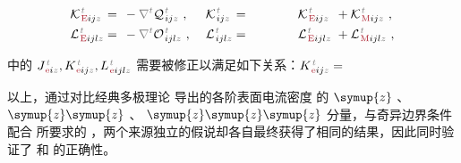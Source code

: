 \begin{subequations}
\begin{align}
	&{\mathcal{K}}^{\;\!\mathcolor{gray}{t}}_{\;\!\textcolor{Maroon}{\text{E}} ij \mathcolor{gray}{z}} \hspace{-1em}&&=\hspace{0.2em} &&\hspace{-0.7em}- \mathcolor{gray}{\nabla^t} {\mathcal{Q}}^{\;\!\mathcolor{gray}{t}}_{\;\! ij \mathcolor{gray}{z}}~, &&\hspace{0.3em} {\mathcal{K}}^{\;\!\mathcolor{gray}{t}}_{\;\! ij \mathcolor{gray}{z}} \hspace{-1em}&&=\hspace{0.2em} ~ \hphantom{-\frac{1}{2!} \epsilon^{\hphantom{ij}k}_{i\mathcolor{gray}{j}}} {\mathcal{K}}^{\;\!\mathcolor{gray}{t}}_{\;\!\textcolor{Maroon}{\text{E}} ij \mathcolor{gray}{z}} &&\hspace{-0.7em}+ {\mathcal{K}}^{\;\!\mathcolor{gray}{t}}_{\;\!\textcolor{Maroon}{\text{M}} ij \mathcolor{gray}{z}}~, \label{eq:Ke-Kb-modify} \\
	&{\mathcal{L}}^{\;\!\mathcolor{gray}{t}}_{\;\!\textcolor{Maroon}{\text{E}} ijl \mathcolor{gray}{z}} \hspace{-1em}&&=\hspace{0.2em} &&\hspace{-0.7em}- \mathcolor{gray}{\nabla^t} {\mathcal{O}}^{\;\!\mathcolor{gray}{t}}_{\;\! ijl \mathcolor{gray}{z}}~, &&\hspace{0.3em} {\mathcal{L}}^{\;\!\mathcolor{gray}{t}}_{\;\! ijl \mathcolor{gray}{z}} \hspace{-1em}&&=\hspace{0.2em} ~ \hphantom{-\frac{1}{2!} \epsilon^{\hphantom{ij}k}_{i\mathcolor{gray}{j}}} {\mathcal{L}}^{\;\!\mathcolor{gray}{t}}_{\;\!\textcolor{Maroon}{\text{E}} ijl \mathcolor{gray}{z}} &&\hspace{-0.7em}+ {\mathcal{L}}^{\;\!\mathcolor{gray}{t}}_{\;\!\textcolor{Maroon}{\text{M}} ijl \mathcolor{gray}{z}}~, \label{eq:Le-Lb-modify}
\end{align}
\end{subequations}

中的 ${J}^{\;\!\mathcolor{gray}{t}}_{\;\!\textcolor{Maroon}{\text{e}} i \mathcolor{gray}{z}},{K}^{\;\!\mathcolor{gray}{t}}_{\;\!\textcolor{Maroon}{\text{e}} ij \mathcolor{gray}{z}},{L}^{\;\!\mathcolor{gray}{t}}_{\;\!\textcolor{Maroon}{\text{e}} ijl \mathcolor{gray}{z}}$ 需要被修正以满足如下关系：${K}^{\;\!\mathcolor{gray}{t}}_{\;\!\textcolor{Maroon}{\text{e}} ij \mathcolor{gray}{z}} = $


以上，通过对比经典多极理论  导出的各阶表面电流密度  的 $\symup{z}$ 、 $\symup{z} \symup{z}$ 、 $\symup{z} \symup{z} \symup{z}$ 分量，与奇异边界条件  配合  所要求的 ，两个来源独立的假说却各自最终获得了相同的结果，因此同时验证了  和  的正确性。

